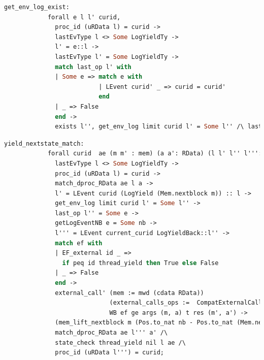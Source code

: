 \begin{lstlisting}[language=Caml]
          get_env_log_exist: 
            forall e l l' curid, 
              proc_id (uRData l) = curid ->
              lastEvType l <> Some LogYieldTy ->
              l' = e::l ->
              lastEvType l' = Some LogYieldTy ->
              match last_op l' with
              | Some e => match e with 
                          | LEvent curid' _ => curid = curid'
                          end
              | _ => False
              end ->
              exists l'', get_env_log limit curid l' = Some l'' /\ lastEvType l'' = Some LogYieldTy;
\end{lstlisting}

\begin{lstlisting}[language=Caml]
          yield_nextstate_match:
            forall curid  ae (m m' : mem) (a a': RData) (l l' l'' l''': Log) e nb WB ef (ge : genv) args m t res,
              lastEvType l <> Some LogYieldTy ->
              proc_id (uRData l) = curid ->
              match_dproc_RData ae l a ->
              l' = LEvent curid (LogYield (Mem.nextblock m)) :: l ->
              get_env_log limit curid l' = Some l'' ->
              last_op l'' = Some e ->
              getLogEventNB e = Some nb -> 
              l''' = LEvent current_curid LogYieldBack::l'' ->
              match ef with 
              | EF_external id _ =>
                if peq id thread_yield then True else False 
              | _ => False
              end ->
              external_call' (mem := mwd (cdata RData)) 
                             (external_calls_ops :=  CompatExternalCalls.compatlayer_extcall_ops (phthread <@$\oplus$@>  L64))
                             WB ef ge args (m, a) t res (m', a') ->
              (mem_lift_nextblock m (Pos.to_nat nb - Pos.to_nat (Mem.nextblock m)) = m') /\
              match_dproc_RData ae l''' a' /\
              state_check thread_yield nil l ae /\
              proc_id (uRData l''') = curid;
\end{lstlisting}

